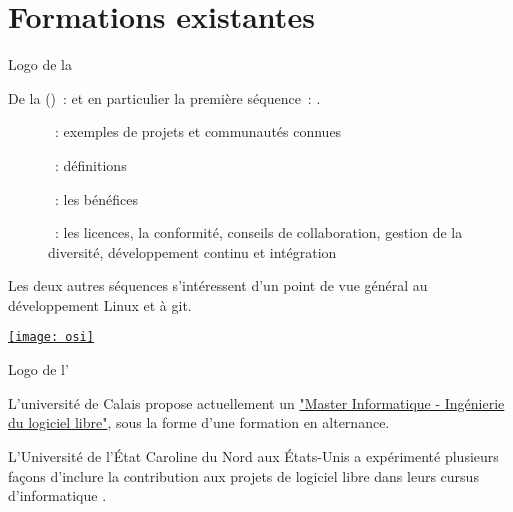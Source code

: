 \chapter{Formations existantes}
\label{chap:existing_teaching}


\begin{marginfigure}
    \href{https://www.linuxfoundation.org/}{}
    \caption{Logo de la }
\end{marginfigure}

De la  () :
  \href{https://www.edx.org/professional-certificate/linuxfoundationx-open-source-software-development-linux-and-git}
  {}
et en particulier la première séquence :
  \href{https://www.edx.org/course/open-source-software-development-linux-for-developers}
  {}.

\begin{description}
    \item[] : exemples de projets et communautés connues
    \item[] : définitions
    \item[] : les bénéfices
    \item[] : les licences, la conformité, conseils de collaboration, gestion de la
        diversité, développement continu et intégration
\end{description}

Les deux autres séquences s'intéressent d'un point de vue général au développement Linux et à git.

\begin{marginfigure}
    \href{https://opensource.org/}{\texttt{[image: osi]}}
    \caption{Logo de l'}
\end{marginfigure}

L'université de Calais propose actuellement un
\href{https://www.univ-littoral.fr/formation/offre-de-formation/masters/master-informatique-ingenierie-du-logiciel-libre/}{"Master
Informatique - Ingénierie du logiciel libre"}, sous la forme d'une formation en alternance.

\label{teaching:ncsu}
L'Université de l'État Caroline du Nord aux États-Unis a expérimenté plusieurs façons d'inclure la
contribution aux projets de logiciel libre dans leurs cursus d'informatique .

